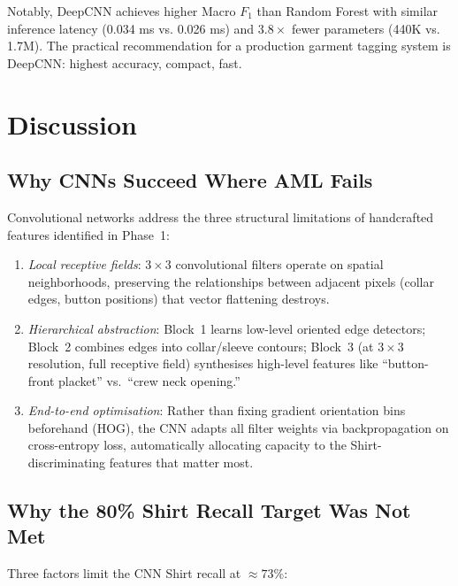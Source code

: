 \documentclass[conference]{IEEEtran}
\begin{document}
Notably, DeepCNN achieves higher Macro $F_1$ than Random Forest with
similar inference latency (0.034 ms vs. 0.026 ms) and $3.8\times$ fewer
parameters (440K vs. 1.7M). The practical recommendation for a production
garment tagging system is DeepCNN: highest accuracy, compact, fast.

\section{Discussion}\label{sec:discussion}

\subsection{Why CNNs Succeed Where AML Fails}

Convolutional networks address the three structural limitations of
handcrafted features identified in Phase~1:

\begin{enumerate}
  \item \emph{Local receptive fields}: $3\times3$ convolutional filters
    operate on spatial neighborhoods, preserving the relationships between
    adjacent pixels (collar edges, button positions) that vector flattening
    destroys.
  \item \emph{Hierarchical abstraction}: Block~1 learns low-level oriented
    edge detectors; Block~2 combines edges into collar/sleeve contours;
    Block~3 (at $3\times3$ resolution, full receptive field) synthesises
    high-level features like ``button-front placket'' vs.\ ``crew neck
    opening.''
  \item \emph{End-to-end optimisation}: Rather than fixing gradient
    orientation bins beforehand (HOG), the CNN adapts all filter weights
    via backpropagation on cross-entropy loss, automatically allocating
    capacity to the Shirt-discriminating features that matter most.
\end{enumerate}

\subsection{Why the 80\% Shirt Recall Target Was Not Met}

Three factors limit the CNN Shirt recall at ${\approx}73\%$:
\end{document}
